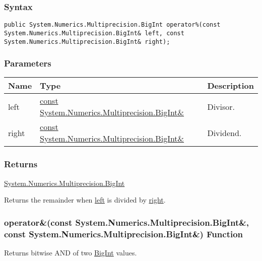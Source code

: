 \documentclass[a4paper,oneside,11.000000pt]{book}
\begin{document}
\subsubsection*{Syntax}
\texttt{public System.Numerics.Multiprecision.BigInt operator\%(const System.Numerics.Multiprecision.BigInt\& left, const System.Numerics.Multiprecision.BigInt\& right);}
\subsubsection*{Parameters}
\begin{flushleft}
\begin{supertabular}[l]{!{\raggedright}p{1.30721cm}!{\raggedright}p{8.55945cm}!{\raggedright}p{2.65538cm}}
\textbf{Name}
& \textbf{Type}
& \textbf{Description}
\\
\hline
left
& \hyperlink{System.Numerics.Multiprecision.BigInt}{const System.\-Numerics.\-Multiprecision.\-BigInt\&\-}
& Divisor.

\\
right
& \hyperlink{System.Numerics.Multiprecision.BigInt}{const System.\-Numerics.\-Multiprecision.\-BigInt\&\-}
& Dividend.

\\
\end{supertabular}

\end{flushleft}
\subsubsection*{Returns}
\hyperlink{System.Numerics.Multiprecision.BigInt}{System.\-Numerics.\-Multiprecision.\-BigInt}
\begin{flushleft}
Returns the remainder when \hyperlink{System.Numerics.Multiprecision.operator.remainder.C.R.System.Numerics.Multiprecision.BigInt.C.R.System.Numerics.Multiprecision.BigInt.left}{left} is divided by 
\hyperlink{System.Numerics.Multiprecision.operator.remainder.C.R.System.Numerics.Multiprecision.BigInt.C.R.System.Numerics.Multiprecision.BigInt.right}{right}.

\end{flushleft}
\clearpage

\hypertarget{System.Numerics.Multiprecision.operator.and.C.R.System.Numerics.Multiprecision.BigInt.C.R.System.Numerics.Multiprecision.BigInt}{\subsubsection*{operator\&(const System.Numerics.Multiprecision.BigInt\&, const System.Numerics.Multiprecision.BigInt\&) Function}}
\begin{flushleft}
Returns bitwise AND of two \hyperlink{System.Numerics.Multiprecision.BigInt}{BigInt} values.

\end{flushleft}
\end{document}

